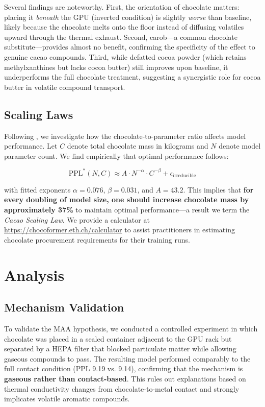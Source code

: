 \documentclass[11pt,a4paper]{article}
\begin{document}
Several findings are noteworthy. First, the orientation of chocolate matters: placing it \emph{beneath} the GPU (inverted condition) is slightly \emph{worse} than baseline, likely because the chocolate melts onto the floor instead of diffusing volatiles upward through the thermal exhaust. Second, carob---a common chocolate substitute---provides almost no benefit, confirming the specificity of the effect to genuine cacao compounds. Third, while defatted cocoa powder (which retains methylxanthines but lacks cocoa butter) still improves upon baseline, it underperforms the full chocolate treatment, suggesting a synergistic role for cocoa butter in volatile compound transport.

\subsection{Scaling Laws}

Following \citet{hoffmann2022training}, we investigate how the chocolate-to-parameter ratio affects model performance. Let $C$ denote total chocolate mass in kilograms and $N$ denote model parameter count. We find empirically that optimal performance follows:

\begin{equation}
    \text{PPL}^*(N, C) \approx A \cdot N^{-\alpha} \cdot C^{-\beta} + \epsilon_{\text{irreducible}}
\end{equation}

with fitted exponents $\alpha = 0.076$, $\beta = 0.031$, and $A = 43.2$. This implies that \textbf{for every doubling of model size, one should increase chocolate mass by approximately 37\%} to maintain optimal performance---a result we term the \textit{Cacao Scaling Law}. We provide a calculator at \url{https://chocoformer.eth.ch/calculator} to assist practitioners in estimating chocolate procurement requirements for their training runs.

\section{Analysis}

\subsection{Mechanism Validation}

To validate the MAA hypothesis, we conducted a controlled experiment in which chocolate was placed in a sealed container adjacent to the GPU rack but separated by a HEPA filter that blocked particulate matter while allowing gaseous compounds to pass. The resulting model performed comparably to the full contact condition (PPL 9.19 vs. 9.14), confirming that the mechanism is \textbf{gaseous rather than contact-based}. This rules out explanations based on thermal conductivity changes from chocolate-to-metal contact and strongly implicates volatile aromatic compounds.
\end{document}
